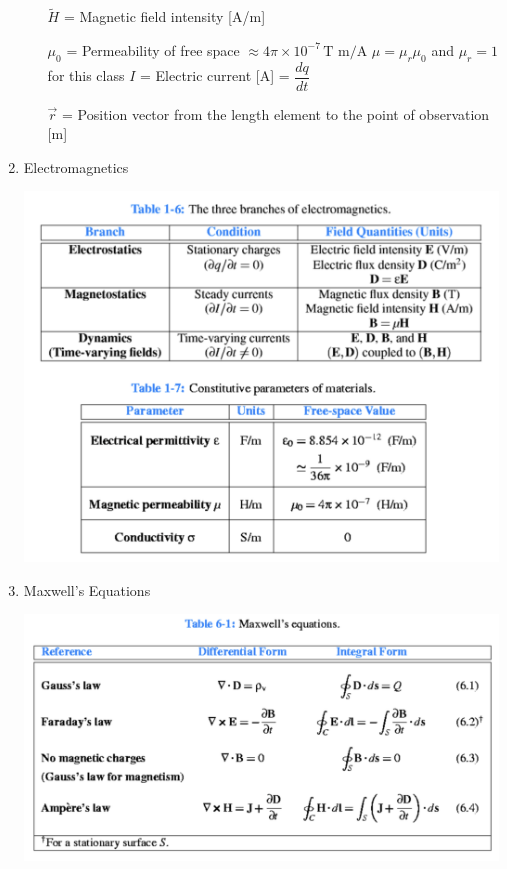 \documentclass[10pt]{article}
\renewcommand{\frac}{\dfrac}
\begin{document}
\begin{enumerate}
\begin{itemize}
		$\tilde{H}$ = Magnetic field intensity [A/m]

		$\mu_0$ = Permeability of free space \(\approx 4\pi \times 10^{-7} \, \text{T m/A}\)
		$\mu = \mu_r \mu_0$ and $\mu_r = 1$ for this class
		$I$ = Electric current [A] = $\frac{dq}{dt}$

		$\vec{r}$ = Position vector from the length element to the point of observation [m]
		\end{itemize}
		
	
		
	\item Electromagnetics
		
		\includegraphics[width=0.99\textwidth]{figs/Electromagnetics.png}
	
	\item Maxwell’s Equations
	
	\includegraphics[width=0.99\textwidth]{figs/MaxwellsEquations.png}
	

\end{enumerate}
\end{document}
